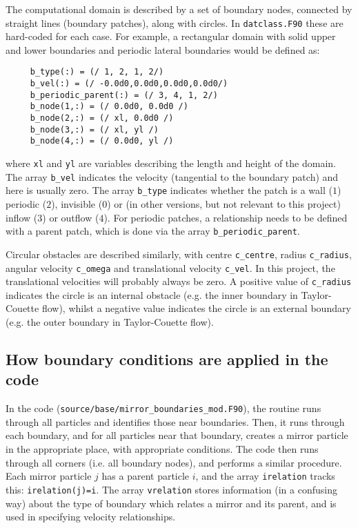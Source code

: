 \documentclass[notitlepage]{revtex4-2}
\begin{document}
The computational domain is described by a set of boundary nodes, connected by straight lines (boundary patches), along with circles. In \texttt{datclass.F90} these are hard-coded for each case. For example, a rectangular domain with solid upper and lower boundaries and periodic lateral boundaries would be defined as:
\begin{verbatim}
     b_type(:) = (/ 1, 2, 1, 2/)
     b_vel(:) = (/ -0.0d0,0.0d0,0.0d0,0.0d0/)    
     b_periodic_parent(:) = (/ 3, 4, 1, 2/)
     b_node(1,:) = (/ 0.0d0, 0.0d0 /)
     b_node(2,:) = (/ xl, 0.0d0 /)
     b_node(3,:) = (/ xl, yl /)
     b_node(4,:) = (/ 0.0d0, yl /)
\end{verbatim}
where \texttt{xl} and \texttt{yl} are variables describing the length and height of the domain. The array \verb!b_vel! indicates the velocity (tangential to the boundary patch) and here is usually zero. The array \verb!b_type! indicates whether the patch is a wall ($1$) periodic ($2$), invisible ($0$) or (in other versions, but not relevant to this project) inflow ($3$) or outflow ($4$). For periodic patches, a relationship needs to be defined with a parent patch, which is done via the array \verb!b_periodic_parent!.

Circular obstacles are described similarly, with centre \verb!c_centre!, radius \verb|c_radius|, angular velocity \verb|c_omega| and translational velocity \verb|c_vel|. In this project, the translational velocities will probably always be zero. A positive value of \verb|c_radius| indicates the circle is an internal obstacle (e.g. the inner boundary in Taylor-Couette flow), whilst a negative value indicates the circle is an external boundary (e.g. the outer boundary in Taylor-Couette flow).

\subsection{How boundary conditions are applied in the code}

In the code (\verb|source/base/mirror_boundaries_mod.F90|), the routine runs through all particles and identifies those near boundaries. Then, it runs through each boundary, and for all particles near that boundary, creates a mirror particle in the appropriate place, with appropriate conditions. The code then runs through all corners (i.e. all boundary nodes), and performs a similar procedure. Each mirror particle $j$ has a parent particle $i$, and the array \verb|irelation| tracks this: \verb|irelation(j)=i|. The array \verb|vrelation| stores information (in a confusing way) about the type of boundary which relates a mirror and its parent, and is used in specifying velocity relationships.
\end{document}
